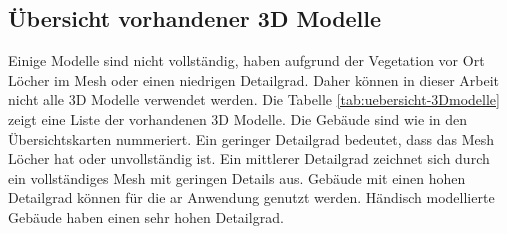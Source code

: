 \subsection{Übersicht vorhandener 3D Modelle}
Einige Modelle sind nicht vollständig, haben aufgrund der Vegetation vor Ort Löcher im Mesh oder einen niedrigen Detailgrad. Daher können in dieser Arbeit nicht alle 3D Modelle verwendet werden. Die Tabelle \ref{tab:uebersicht-3Dmodelle} zeigt eine Liste der vorhandenen 3D Modelle. Die Gebäude sind wie in den Übersichtskarten nummeriert. Ein geringer Detailgrad bedeutet, dass das Mesh Löcher hat oder unvollständig ist. Ein mittlerer Detailgrad zeichnet sich durch ein vollständiges Mesh mit geringen Details aus. Gebäude mit einen hohen Detailgrad können für die \Gls{ar} Anwendung genutzt werden. Händisch modellierte Gebäude haben einen sehr hohen Detailgrad.
